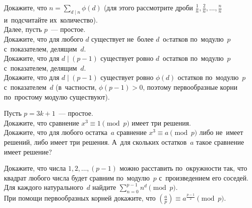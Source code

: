 \begin{problems}

\item
\sp
Докажите, что
\(
    n = \sum_{d \mid n} \phi(d)
\)
(для этого рассмотрите дроби $\frac{1}{n}, \frac{2}{n}, \ldots, \frac{n}{n}$
и~подсчитайте их~количество).
\\
Далее, пусть $p$~--- простое.
\\
\sp
Докажите, что для любого $d$ существует не~более $d$~оcтатков по~модулю~$p$
с~показателем, делящим~$d$.
\\
\sp
Докажите, что для $d \mid (p - 1)$ существует ровно $d$~остатков по~модулю~$p$
с~показателем, делящим~$d$.
\\
\sp
Докажите, что для $d \mid (p - 1)$ существует ровно $\phi(d)$ остатков
по~модулю~$p$ с~показателем~$d$
(в~частности, $\phi(p - 1) > 0$, поэтому первообразные корни по~простому модулю
существуют).

\item
Пусть $p = 3 k + 1$~--- простое.
\\
\sp
Докажите, что сравнение $x^3 \equiv 1 \pmod p$ имеет три решения.
\\
\sp
Докажите, что для любого остатка~$a$ сравнение $x^3 \equiv a \pmod p$ либо
не~имеет решений, либо имеет три решения.
А~для скольких остатков~$a$ такое сравнение имеет решение?

\item
\sp
Докажите, что числа $1, 2, \ldots, (p - 1)$ можно расставить по~окружности так,
что квадрат любого числа будет сравним по~модулю~$p$ с~произведением его
соседей.
\\
\sp
Для каждого натурального~$d$ найдите
\(
    \sum_{n=0}^{p-1} n^d \pmod p
\).
\\
\sp
При помощи первообразных корней докажите, что
\(
    \genfrac{(}{)}{}{}{a}{p}
\equiv
    a^{\frac{p-1}{2}}
\pmod p
\).


\end{problems}
